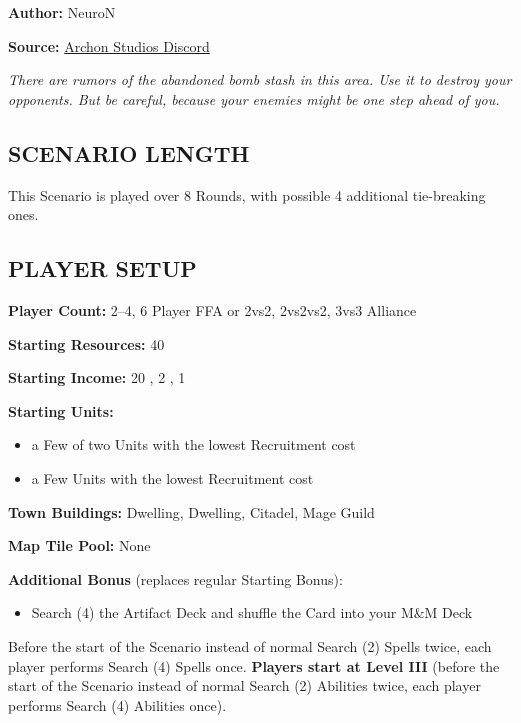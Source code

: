 
\begin{multicols}{2}

\textbf{Author:} NeuroN

\textbf{Source:} \href{https://discord.com/channels/740870068178649108/1278750250722525203/1278750250722525203}{Archon Studios Discord}

\textit{There are rumors of the abandoned bomb stash in this area.
Use it to destroy your opponents.
But be careful, because your enemies might be one step ahead of you.}

\subsection*{\MakeUppercase{Scenario Length}}
This Scenario is played over 8 Rounds, with possible 4 additional tie-breaking ones.

\subsection*{\MakeUppercase{Player Setup}}
\textbf{Player Count:} 2--4, 6 Player FFA or 2vs2, 2vs2vs2, 3vs3 Alliance

\textbf{Starting Resources:} 40 

\textbf{Starting Income:} 20 , 2 , 1 

\textbf{Starting Units:}
\begin{itemize}
  \item a Few of two  Units with the lowest Recruitment cost
  \item a Few  Units with the lowest Recruitment cost
\end{itemize}

\textbf{Town Buildings:}  Dwelling,  Dwelling, Citadel, Mage Guild

\textbf{Map Tile Pool:} None

\textbf{Additional Bonus} (replaces regular Starting Bonus):

\begin{itemize}
  \item Search (4) the Artifact Deck and shuffle the Card into your M\&M Deck
\end{itemize}
Before the start of the Scenario instead of normal Search (2) Spells twice, each player performs Search (4) Spells once.
\textbf{Players start at Level III} (before the start of the Scenario instead of normal Search (2) Abilities twice, each player performs Search (4) Abilities once).


\end{multicols}
